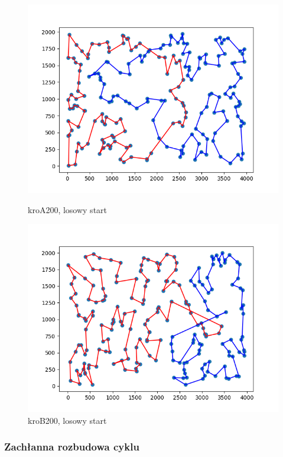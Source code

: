 \documentclass[11pt]{article}
\begin{document}
\begin{figure}[H]
    \begin{minipage}[t]{0.45\textwidth}
        \centering
        \includegraphics[width=\linewidth]{best_paths/kroA200/LNS_no_LS}
        \caption{kroA200, losowy start}
    \end{minipage}
    \hfill
    \begin{minipage}[t]{0.45\textwidth}
        \centering
        \includegraphics[width=\linewidth]{best_paths/kroB200/LNS_no_LS}
        \caption{kroB200, losowy start}
    \end{minipage}\label{fig:figure4}
\end{figure}

\subsubsection{Zachłanna rozbudowa cyklu}
\end{document}
